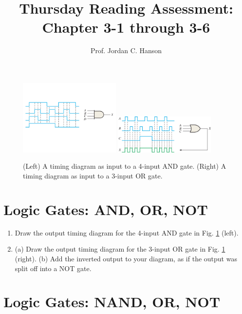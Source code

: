 \documentclass{article}
\begin{document}
\title{Thursday Reading Assessment: Chapter 3-1 through 3-6}
\author{Prof. Jordan C. Hanson}

\maketitle

\begin{figure}[ht]
\centering
\includegraphics[width=0.45\textwidth,trim=0cm 4cm 0cm 4cm,clip=true]{figures/4and.pdf}
\includegraphics[width=0.45\textwidth,trim=0cm 2cm 0cm 0cm,clip=true]{figures/4OR.jpg}
\caption{\label{fig:4and} (Left) A timing diagram as input to a 4-input AND gate. (Right) A timing diagram as input to a 3-input OR gate.}
\end{figure}

\section{Logic Gates: AND, OR, NOT}

\begin{enumerate}
\item Draw the output timing diagram for the 4-input AND gate in Fig. \ref{fig:4and} (left). \\ \vspace{0.5cm}
\item (a) Draw the output timing diagram for the 3-input OR gate in Fig. \ref{fig:4and} (right). (b) Add the inverted output to your diagram, as if the output was split off into a NOT gate. \\ \vspace{0.5cm}
\end{enumerate}

\section{Logic Gates: NAND, OR, NOT}
\end{document}
